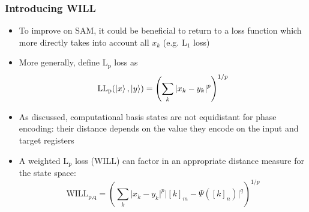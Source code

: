 \documentclass{beamer}
\begin{document}
\begin{frame}
\frametitle{Introducing WILL}
\begin{itemize}
\item To improve on SAM, it could be beneficial to return to a loss function which more directly takes into account all $x_k$ (e.g. L$_1$ loss)
\item More generally, define \alert{L$_\text{p}$ loss} as 
\begin{equation}
\text{LL}_\text{p} (\ket{x}, \ket{y}) = \left( \sum_k |x_k -y_k|^p \right)^{1/p}
\end{equation}
\item As discussed, \alert{computational basis states are not equidistant} for phase encoding: their distance depends on the value they encode on the input and target registers
\item A \alert{weighted L$_\text{p}$ loss (WILL)} can factor in an appropriate distance measure for the state space:
\begin{equation}
\text{WILL}_\text{p,q} =  \left( \sum_k \Big|x_k -y_k \Big|^p \Big|[k]_m - \Psi([k]_n) \Big|^q \right)^{1/p}
\end{equation}
\end{itemize}
\end{frame}
\end{document}
